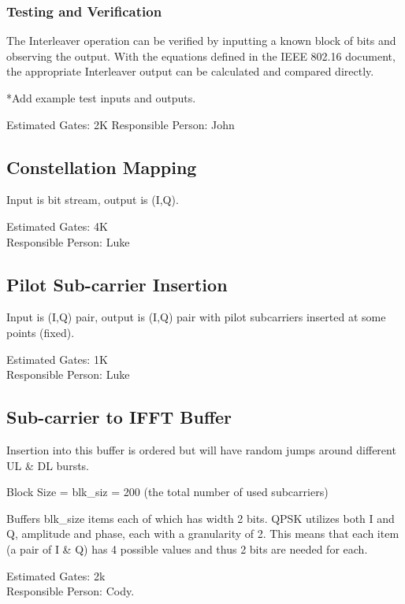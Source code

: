\documentclass[dvips,10pt,twocolumn]{article}
\begin{document}
  \subsubsection{Testing and Verification}
  
  The Interleaver operation can be verified by inputting a known block of bits
  and observing the output. With the equations defined in the IEEE 802.16
  document, the appropriate Interleaver output can be calculated and compared
  directly. 
  
  *Add example test inputs and outputs. 

  Estimated Gates: 2K
  Responsible Person: John

	\subsection{Constellation Mapping}
	\label{sec:constellation}

	Input is bit stream, output is (I,Q).
	
	Estimated Gates: 4K \\
	Responsible Person: Luke

	\subsection{Pilot Sub-carrier Insertion}
	\label{sec:pilot}

	Input is (I,Q) pair, output is (I,Q) pair with pilot subcarriers
	inserted at some points (fixed).

	Estimated Gates: 1K \\
	Responsible Person: Luke

	\subsection{Sub-carrier to IFFT Buffer}
	\label{sec:ifft-buffer}
	Insertion into this buffer is ordered but will have random
	jumps around different UL \& DL bursts.

	Block Size = blk\_siz = 200 (the total number of used
	subcarriers)
	
	Buffers blk\_size items each of which has width 2 bits.
	QPSK utilizes both I and Q, amplitude and phase, each with
	a granularity of 2. This means that each item (a pair of I
	\& Q) has 4 possible values and thus 2 bits are needed for
	each.

	Estimated Gates: 2k \\
	Responsible Person: Cody.
\end{document}
